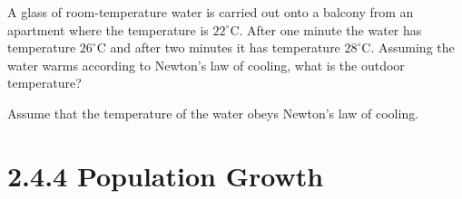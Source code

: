\begin{frame}[t]
A glass of room-temperature water is carried out onto a balcony from an
apartment where the temperature is $22^\circ$C. After one minute the water has
temperature $26^\circ$C and after two minutes it has temperature $28^\circ$C.
Assuming the water warms according to Newton's law of cooling, what is the outdoor temperature?

Assume that the temperature of the water obeys Newton's law of cooling.
 
\vspace{-7mm}

\end{frame}
\section{2.4.4 Population Growth}

